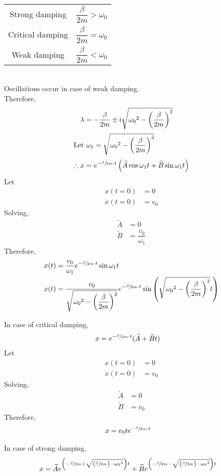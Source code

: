 \documentclass[fleqn, a4paper, 12pt]{article}
\theoremstyle{definition}
\theoremstyle{theorem}
\begin{document}
\begin{tabular}{c c}
	Strong damping & $\dfrac{\beta}{2m} > \omega_0$\\[2ex]
	Critical damping & $\dfrac{\beta}{2m} = \omega_0$\\[2ex]
	Weak damping & $\dfrac{\beta}{2m} < \omega_0$\\[2ex]
\end{tabular}\\
Oscillations occur in case of weak damping.\\
Therefore,
\begin{align*}
	\lambda &= -\dfrac{\beta}{2m} \pm i \sqrt{{\omega_0}^2 - \left( \dfrac{\beta}{2m} \right)^2}\\
	\intertext{Let $\omega_1 = \sqrt{{\omega_0}^2 - \left( \dfrac{\beta}{2m} \right)^2}$}
	\therefore x &= e^{-\sfrac{\beta}{2m} \cdot t} \left( \widetilde{A} \cos \omega_1 t + \widetilde{B} \sin \omega_1 t \right)
\end{align*}
Let
\begin{align*}
	x(t = 0) &= 0\\
	\dot{x}(t = 0) &= v_0
\end{align*}
Solving,
\begin{align*}
	\widetilde{A} &= 0\\
	\widetilde{B} &= \dfrac{v_0}{\omega_1}
\end{align*}
Therefore,
\begin{align*}	
	x(t) &= \dfrac{v_0}{\omega_1} e^{-\sfrac{\beta}{2m} \cdot t} \sin \omega_1 t\\
	x(t) &= \dfrac{v_0}{\sqrt{{\omega_0}^2 - \left( \dfrac{\beta}{2m} \right)^2}} e^{-\sfrac{\beta}{2m} \cdot t} \sin \left( \sqrt{{\omega_0}^2 - \left( \dfrac{\beta}{2m} \right)^2} t \right)
\end{align*}

In case of critical damping,
\begin{align*}
	x &= e^{-\sfrac{\beta}{2m} \cdot t} (\widetilde{A} + \widetilde{B} t)
\end{align*}
Let
\begin{align*}
	x(t = 0) &= 0\\
	\dot{x}(t = 0) &= v_0
\end{align*}
Solving,
\begin{align*}
	\widetilde{A} &= 0\\
	\widetilde{B} &= v_0
\end{align*}
Therefore,
\begin{align*}
	x &= v_0 t e^{-\sfrac{\beta}{2m} \cdot t}
\end{align*}

In case of strong damping,
\begin{align*}
	x &= \widetilde{A} e^{\left( -\sfrac{\beta}{2m} + \sqrt{\left( \sfrac{\beta}{2m} \right) - {\omega_0}^2} \right) t} + \widetilde{B} e^{\left( -\sfrac{\beta}{2m} - \sqrt{\left( \sfrac{\beta}{2m} \right) - {\omega_0}^2} \right) t}
\end{align*}
\end{document}

